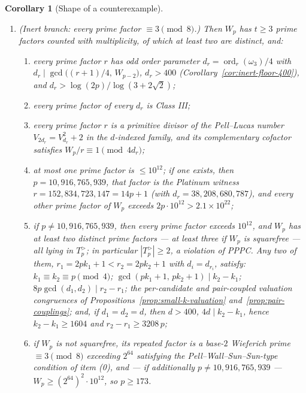 \documentclass[11pt]{amsart}
\theoremstyle{plain}
\newtheorem{corollary}[theorem]{Corollary}
\theoremstyle{definition}
\theoremstyle{remark}
\numberwithin{equation}{section}
\newcommand{\ord}{\operatorname{ord}}
\begin{document}
\begin{corollary}[Shape of a counterexample]
\begin{enumerate}
\item[(b)] \emph{(Inert branch: every prime factor
$\equiv 3 \pmod 8$.)} Then $W_p$ has $t \geq 3$ prime factors counted
with multiplicity, of which at least two are distinct, and:
  \begin{enumerate}
  \item[(b1)] every prime factor $r$ has odd order parameter
  $d_r = \ord_r(\omega_3)/4$ with
  $d_r \mid \gcd\!\big((r+1)/4,\, W_{p-2}\big)$, $d_r > 400$
  (Corollary~\ref{cor:inert-floor-400}), and
  $d_r > \log(2p)/\log(3 + 2\sqrt 2)$;
  \item[(b2)] every prime factor of every $d_r$ is Class III;
  \item[(b3)] every prime factor $r$ is a primitive divisor of the
  Pell--Lucas number $V_{2 d_r} = V_{d_r}^2 + 2$ in the $d$-indexed
  family, and its complementary cofactor satisfies
  $W_p / r \equiv 1 \pmod{4 d_r}$;
  \item[(b4)] at most one prime factor is $\leq 10^{12}$; if one exists,
  then $p = 10{,}916{,}765{,}939$, that factor is the Platinum witness
  $r = 152{,}834{,}723{,}147 = 14 p + 1$ (with
  $d_r = 38{,}208{,}680{,}787$), and every other prime factor of $W_p$
  exceeds $2 p \cdot 10^{12} > 2.1 \times 10^{22}$;
  \item[(b5)] if $p \neq 10{,}916{,}765{,}939$, then every prime factor
  exceeds $10^{12}$, and $W_p$ has at least two distinct prime factors
  --- at least three if $W_p$ is squarefree --- all lying in $T_p^{>}$;
  in particular $|T_p^{>}| \geq 2$, a violation of PPPC. Any two of
  them, $r_1 = 2 p k_1 + 1 < r_2 = 2 p k_2 + 1$ with
  $d_i = d_{r_i}$, satisfy: $k_1 \equiv k_2 \equiv p \pmod 4$;
  $\gcd(p k_1 + 1,\, p k_2 + 1) \mid k_2 - k_1$;
  $8 p \gcd(d_1, d_2) \mid r_2 - r_1$; the per-candidate and
  pair-coupled valuation congruences of
  Propositions~\ref{prop:small-k-valuation}
  and~\ref{prop:pair-couplings}; and, if $d_1 = d_2 = d$, then
  $d > 400$, $4 d \mid k_2 - k_1$, hence $k_2 - k_1 \geq 1604$ and
  $r_2 - r_1 \geq 3208\, p$;
  \item[(b6)] if $W_p$ is not squarefree, its repeated factor is a
  base-$2$ Wieferich prime $\equiv 3 \pmod 8$ exceeding $2^{64}$
  satisfying the Pell--Wall--Sun--Sun-type condition of item (0), and
  --- if additionally $p \neq 10{,}916{,}765{,}939$ ---
  $W_p \geq (2^{64})^2 \cdot 10^{12}$, so $p \geq 173$.
  \end{enumerate}
\end{enumerate}
\end{corollary}
\end{document}
